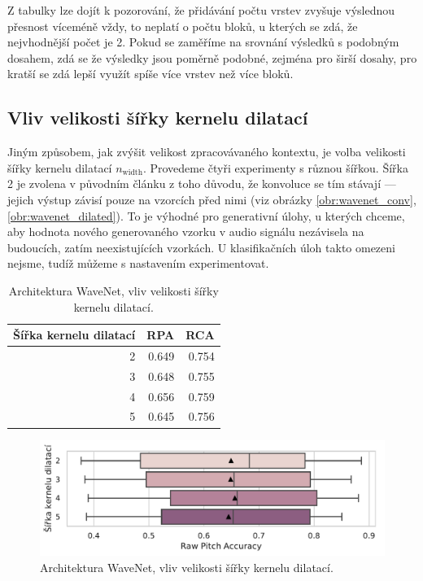 Z tabulky lze dojít k pozorování, že přidávání počtu vrstev zvyšuje výslednou přesnost víceméně vždy, to neplatí o počtu bloků, u kterých se zdá, že nejvhodnější počet je 2. Pokud se zaměříme na srovnání výsledků s podobným dosahem, zdá se že výsledky jsou poměrně podobné, zejména pro širší dosahy, pro kratší se zdá lepší využít spíše více vrstev než více bloků.

\subsection{Vliv velikosti šířky kernelu dilatací}

Jiným způsobem, jak zvýšit velikost zpracovávaného kontextu, je volba velikosti šířky kernelu dilatací $n_{\mathrm{width}}$. Provedeme čtyři experimenty s různou šířkou. Šířka 2 je zvolena v původním článku z toho důvodu, že konvoluce se tím stávají  --- jejich výstup závisí pouze na vzorcích před nimi (viz obrázky \ref{obr:wavenet_conv}, \ref{obr:wavenet_dilated}). To je výhodné pro generativní úlohy, u kterých chceme, aby hodnota nového generovaného vzorku v audio signálu nezávisela na budoucích, zatím neexistujících vzorkách. U klasifikačních úloh takto omezeni nejsme, tudíž můžeme s nastavením experimentovat. 

\begin{table}[h!]
\centering
    \begin{tabular}{rrr}
    \toprule
    Šířka kernelu dilatací &   RPA &   RCA \\
    \midrule
                        2 & 0.649 & 0.754 \\
                        3 & 0.648 & 0.755 \\
                        4 & 0.656 & 0.759 \\
                        5 & 0.645 & 0.756 \\
    \bottomrule
    \end{tabular}
\caption{Architektura WaveNet, vliv velikosti šířky kernelu dilatací.}\label{tab:wavenet_dilation_width}
\end{table}

\begin{figure}[h]\centering
    \includegraphics[scale=0.6]{../img/figures/wavenet_dilation_width.pdf}
\caption{Architektura WaveNet, vliv velikosti šířky kernelu dilatací.}\label{obr:wavenet_dilation_width}
\end{figure}

